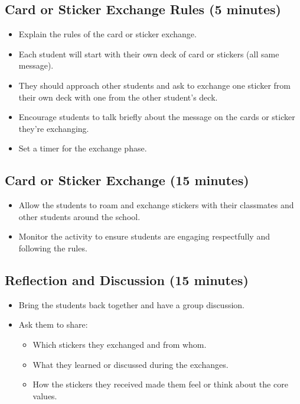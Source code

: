 \documentclass[11pt]{article}
\begin{document}
\subsection{Card or Sticker Exchange Rules (5 minutes)}
\label{sec:org91c8a77}
\begin{itemize}
\item Explain the rules of the card or sticker exchange.
\item Each student will start with their own deck of card or stickers (all same
message).
\item They should approach other students and ask to exchange one sticker from their
own deck with one from the other student's deck.
\item Encourage students to talk briefly about the message on the cards or sticker
they're exchanging.
\item Set a timer for the exchange phase.
\end{itemize}

\subsection{Card or Sticker Exchange (15 minutes)}
\label{sec:org23b9c65}
\begin{itemize}
\item Allow the students to roam and exchange stickers with their classmates and other
students around the school.
\item Monitor the activity to ensure students are engaging respectfully and following
the rules.
\end{itemize}

\subsection{Reflection and Discussion (15 minutes)}
\label{sec:org5d20476}
\begin{itemize}
\item Bring the students back together and have a group discussion.
\item Ask them to share:
\begin{itemize}
\item Which stickers they exchanged and from whom.
\item What they learned or discussed during the exchanges.
\item How the stickers they received made them feel or think about the core values.
\end{itemize}
\end{itemize}
\end{document}
